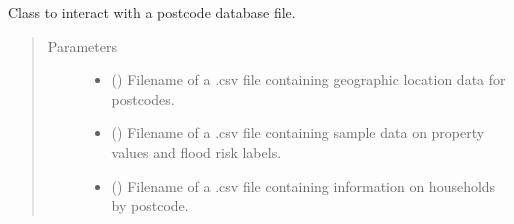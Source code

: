 \documentclass[letterpaper,10pt,english]{sphinxmanual}
\begin{document}
\begin{fulllineitems}
\label{\detokenize{index:flood_tool.Tool}}
\sphinxAtStartPar
Class to interact with a postcode database file.
\begin{quote}\begin{description}
\item[{Parameters}] \leavevmode\begin{itemize}
\item {} 
\sphinxAtStartPar
{} (\sphinxstyleliteralemphasis{\sphinxupquote{, }}) \textendash{} Filename of a .csv file containing geographic location
data for postcodes.

\item {} 
\sphinxAtStartPar
{} (\sphinxstyleliteralemphasis{\sphinxupquote{, }}) \textendash{} Filename of a .csv file containing sample data on property
values and flood risk labels.

\item {} 
\sphinxAtStartPar
{} (\sphinxstyleliteralemphasis{\sphinxupquote{, }}) \textendash{} Filename of a .csv file containing information on households
by postcode.

\end{itemize}

\end{description}\end{quote}


\end{fulllineitems}
\end{document}
